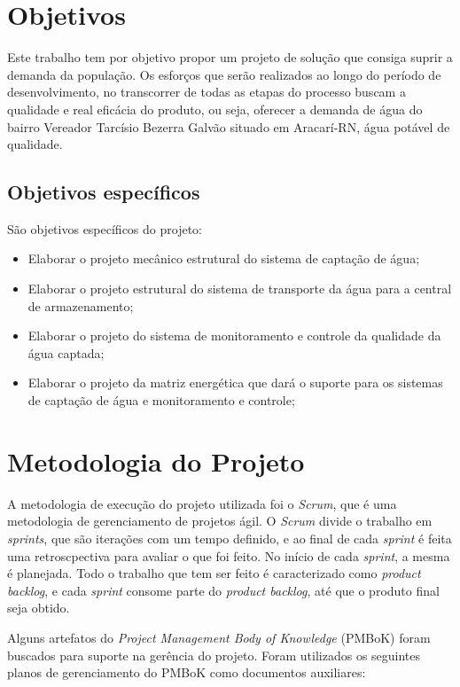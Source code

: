 \section{Objetivos}

Este trabalho tem por objetivo propor um projeto de solução que consiga suprir a demanda da população. Os esforços que serão
realizados ao longo do período de desenvolvimento, no transcorrer de todas as etapas do processo buscam a qualidade e real
eficácia do produto, ou seja, oferecer a demanda de água do bairro Vereador Tarcísio Bezerra Galvão situado em Aracarí-RN, 
água potável de qualidade.

 \subsection{Objetivos específicos}
 
 São objetivos específicos do projeto:
 \begin{itemize}
  \item Elaborar o projeto mecânico estrutural do sistema de captação de água;
  \item Elaborar o projeto estrutural do sistema de transporte da água para a central de armazenamento;
  \item Elaborar o projeto do sistema de monitoramento e controle da qualidade da água captada;
  \item Elaborar o projeto da matriz energética que dará o suporte para os sistemas de captação de água e monitoramento e controle;
 \end{itemize}

 
\section{Metodologia do Projeto}

A metodologia de execução do projeto utilizada foi o \textit{Scrum}, que é uma metodologia de gerenciamento de projetos ágil.
O \textit{Scrum} divide o trabalho em \textit{sprints}, que são iterações com um tempo definido, e ao final de cada 
\textit{sprint} é feita uma retroscpectiva para avaliar o que foi feito. No início de cada \textit{sprint},
a mesma é planejada. Todo o trabalho que tem ser feito é caracterizado como \textit{product backlog}, e cada \textit{sprint}
consome parte do \textit{product backlog}, até que o produto final seja obtido.

Alguns artefatos do \textit{Project Management Body of Knowledge} (PMBoK) foram buscados para suporte na gerência do projeto.
Foram utilizados os seguintes planos de gerenciamento do PMBoK como documentos auxiliares:

